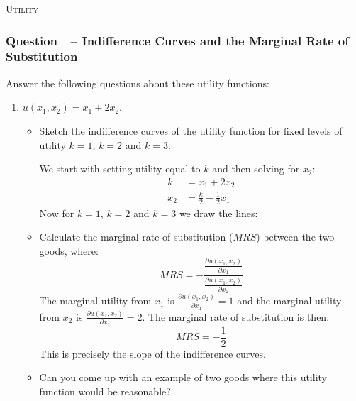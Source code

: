 \documentclass[12pt]{article}
\newcommand{\topic}[1]{\begin{center}\large\textsc{#1}\normalsize\end{center}}
\newcounter{question}[section]
\newcommand{\question}[1]{\refstepcounter{question}
  \subsubsection*{Question~\thequestion~-- #1}}
\newenvironment{subquestions}{
  \begin{enumerate}[label=(\roman*)]}{\end{enumerate}}
\begin{document}
\newpage
\topic{Utility}
\question{Indifference Curves and the Marginal Rate of Substitution}
Answer the following questions about these utility functions:
\begin{subquestions}
  \item $u\left(x_1, x_2  \right)=x_1 + 2x_2$.
    \begin{itemize}
      \item Sketch the indifference curves of the utility function for
        fixed levels of utility $k=1$, $k=2$ and $k=3$.

        \textcolor{solution-color}{
          We start with setting utility equal to $k$ and then solving for $x_2$:
          \begin{align*}
            k &= x_1 + 2x_2 \\
            x_2 &= \frac{k}{2} - \frac{1}{2}x_1
          \end{align*}
          Now for $k=1$, $k=2$ and $k=3$ we draw the lines:
          \begin{center}
          \end{center}
        }
      \item Calculate the marginal rate of substitution ($MRS$) between the two
        goods, where: \[ MRS = -\frac{\frac{\partial u\left( x_1,x_2
        \right)}{\partial x_1}}{\frac{\partial u\left( x_1,x_2
      \right)}{\partial x_2}} \]
        \textcolor{solution-color}{
          The marginal utility from $x_1$ is $\frac{\partial u\left( x_1,x_2
          \right)}{\partial x_1}=1$ and
          the marginal utility from $x_2$ is $\frac{\partial u\left( x_1,x_2
          \right)}{\partial x_2}=2$. The marginal rate of substitution is then:
          \[
            MRS=-\frac{1}{2}
          \]
          This is precisely the slope of the indifference curves.
        }
      \item Can you come up with an example of two goods where this
      utility function would be reasonable?


\end{itemize}
\end{subquestions}
\end{document}
